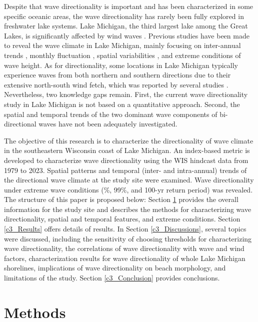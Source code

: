 Despite that wave directionality is important and has been characterized in some specific oceanic areas, the wave directionality has rarely been fully explored in freshwater lake systems. Lake Michigan, the third largest lake among the Great Lakes, is significantly affected by wind waves \citep{huang_impacts_2021,huang_wave_2021}. Previous studies have been made to reveal the wave climate in Lake Michigan, mainly focusing on inter-annual trends \citep{olsen_long_2019,jabbari_increases_2021}, monthly fluctuation \citep{meadows_relationship_1997,huang_wave_2021}, spatial variabilities \citep{huang_wave_2021}, and extreme conditions \citep{sogut_characterizing_2018} of wave height. As for directionality, some locations in Lake Michigan typically experience waves from both northern and southern directions due to their extensive north-south wind fetch, which was reported by several studies \citep{davidson-arnott_wave_1980,booth_wave_1994,olsen_long_2019,abdelhady_shoreline_2025}. Nevertheless, two knowledge gaps remain. First, the current wave directionality study in Lake Michigan is not based on a quantitative approach. Second, the spatial and temporal trends of the two dominant wave components of bi-directional waves have not been adequately investigated.

The objective of this research is to characterize the directionality of wave climate in the southeastern Wisconsin coast of Lake Michigan. An index-based metric is developed to characterize wave directionality using the WIS hindcast data from 1979 to 2023. Spatial patterns and temporal (\eg inter- and intra-annual) trends of the directional wave climate at the study site were examined. Wave directionality under extreme wave conditions (\%, 99\%, and 100-yr return period) was revealed. The structure of this paper is proposed below: Section \ref{c3_Methods} provides the overall information for the study site and describes the methods for characterizing wave directionality, spatial and temporal features, and extreme conditions. Section \ref{c3_Results} offers details of results. In Section \ref{c3_Discussions}, several topics were discussed, including the sensitivity of choosing thresholds for characterizing wave directionality, the correlations of wave directionality with wave and wind factors, characterization results for wave directionality of whole Lake Michigan shorelines, implications of wave directionality on beach morphology, and limitations of the study. Section \ref{c3_Conclusion} provides conclusions.

\section{Methods}
\label{c3_Methods}

